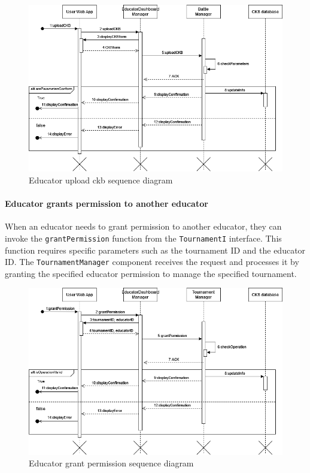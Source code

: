 \begin{figure}[H]
    \begin{center}
        \includegraphics[width=\linewidth]{Images/sequence/Sd_uploadCKB.png}
        \caption{Educator upload ckb sequence diagram}
        \label{fig:Educator_upload_ckb}
    \end{center}
\end{figure}

\paragraph{Educator grants permission to another educator}
When an educator needs to grant permission to another educator, they can invoke the \verb|grantPermission| function from the \verb|TournamentI| interface. This function requires specific parameters such as the tournament ID and the educator ID.
The \verb|TournamentManager| component receives the request and processes it by granting the specified educator permission to manage the specified tournament.

\begin{figure}[H]
    \begin{center}
        \includegraphics[width=\linewidth]{Images/sequence/Sd_grantPermission.png}
        \caption{Educator grant permission sequence diagram}
        \label{fig:Educator_grant_permission}
    \end{center}
\end{figure}


